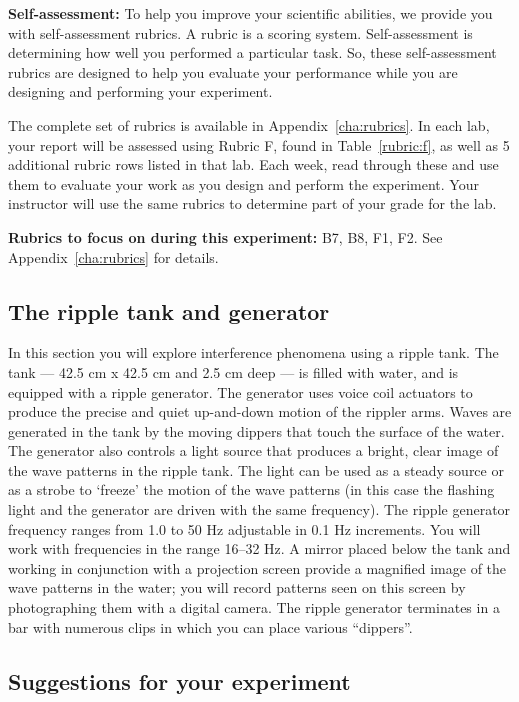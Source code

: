 \begin{framed}
	\textbf{Self-assessment:} To help you improve your scientific abilities, we provide you with self-assessment rubrics.
	A rubric is a scoring system.
	Self-assessment is determining how well you performed a particular task.
	So, these self-assessment rubrics are designed to help you evaluate your performance while you are designing and performing your experiment.
	
	The complete set of rubrics is available in Appendix~\ref{cha:rubrics}.
	In each lab, your report will be assessed using Rubric F, found in Table~\ref{rubric:f}, as well as 5 additional rubric rows listed in that lab.
	Each week, read through these and use them to evaluate your work as you design and perform the experiment.
	Your instructor will use the same rubrics to determine part of your grade for the lab.
\end{framed}	

\textbf{Rubrics to focus on during this experiment:} B7, B8, F1, F2. See Appendix~\ref{cha:rubrics} for details.

\subsection{The ripple tank and generator}

In this section you will explore interference phenomena using a ripple tank. The tank --- 42.5 cm x 42.5 cm and 2.5
cm deep --- is filled with water, and is equipped with a ripple generator. The generator uses voice coil actuators to
produce the precise and quiet up-and-down motion of the rippler arms. Waves are generated in the tank by the moving
dippers that touch the surface of the water. The generator also controls a light source that produces a bright, clear
image of the wave patterns in the ripple tank. The light can be used as a steady source or as a strobe to ‘freeze’ the
motion of the wave patterns (in this case the flashing light and the generator are driven with the same frequency). The
ripple generator frequency ranges from 1.0 to 50 Hz adjustable in 0.1 Hz increments. You will work with frequencies in
the range 16--32 Hz. A mirror placed below the tank and working in conjunction with a projection screen provide a
magnified image of the wave patterns in the water; you will record patterns seen on this screen by photographing them
with a digital camera. The ripple generator terminates in a bar with numerous clips in which you can place various
``dippers''.

\subsection{Suggestions for your experiment}

